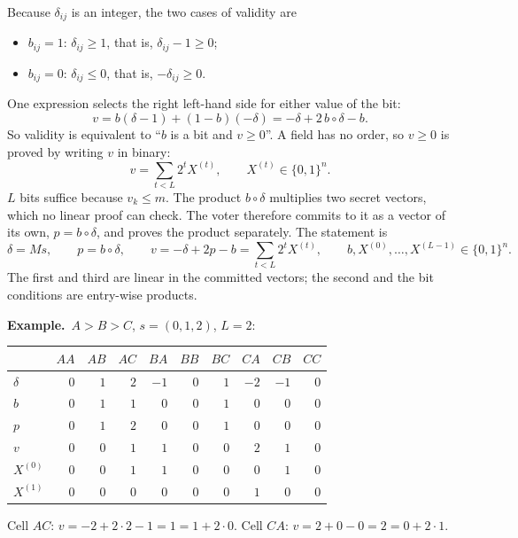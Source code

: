 \documentclass[11pt,a4paper]{article}
\newcommand{\ex}[1]{\par\medskip\noindent\textbf{Example.}~#1\par\medskip}
\theoremstyle{remark}
\begin{document}
Because $\delta_{ij}$ is an integer, the two cases of validity are
\begin{itemize}[nosep]
  \item $b_{ij} = 1$: $\delta_{ij} \ge 1$, that is, $\delta_{ij} - 1 \ge 0$;
  \item $b_{ij} = 0$: $\delta_{ij} \le 0$, that is, $-\delta_{ij} \ge 0$.
\end{itemize}
One expression selects the right left-hand side for either value of the
bit:
\[
  v = b(\delta - 1) + (1 - b)(-\delta) = -\delta + 2\, b \circ \delta - b .
\]
So validity is equivalent to ``$b$ is a bit and $v \ge 0$''. A field has
no order, so $v \ge 0$ is proved by writing $v$ in binary:
\[
  v = \sum_{t < L} 2^{t} X^{(t)}, \qquad X^{(t)} \in \{0, 1\}^{n}.
\]
$L$ bits suffice because $v_k \le m$. The product $b \circ \delta$
multiplies two secret vectors, which no linear proof can check. The voter
therefore commits to it as a vector of its own, $p = b \circ \delta$, and
proves the product separately. The statement is
\[
  \delta = M s, \qquad p = b \circ \delta, \qquad v = -\delta + 2p - b =
  \sum_{t < L} 2^{t} X^{(t)}, \qquad b, X^{(0)}, \ldots, X^{(L-1)} \in
  \{0, 1\}^{n}.
\]
The first and third are linear in the committed vectors; the second and
the bit conditions are entry-wise products.

\ex{$A > B > C$, $s = (0, 1, 2)$, $L = 2$:
\begin{center}
\begin{tabular}{@{}lrrrrrrrrr@{}}
\toprule
 & $AA$ & $AB$ & $AC$ & $BA$ & $BB$ & $BC$ & $CA$ & $CB$ & $CC$ \\
\midrule
$\delta$ & $0$ & $1$ & $2$ & $-1$ & $0$ & $1$ & $-2$ & $-1$ & $0$ \\
$b$ & $0$ & $1$ & $1$ & $0$ & $0$ & $1$ & $0$ & $0$ & $0$ \\
$p$ & $0$ & $1$ & $2$ & $0$ & $0$ & $1$ & $0$ & $0$ & $0$ \\
$v$ & $0$ & $0$ & $1$ & $1$ & $0$ & $0$ & $2$ & $1$ & $0$ \\
$X^{(0)}$ & $0$ & $0$ & $1$ & $1$ & $0$ & $0$ & $0$ & $1$ & $0$ \\
$X^{(1)}$ & $0$ & $0$ & $0$ & $0$ & $0$ & $0$ & $1$ & $0$ & $0$ \\
\bottomrule
\end{tabular}
\end{center}
Cell $AC$: $v = -2 + 2 \cdot 2 - 1 = 1 = 1 + 2 \cdot 0$. Cell $CA$: $v = 2
+ 0 - 0 = 2 = 0 + 2 \cdot 1$.}
\end{document}
